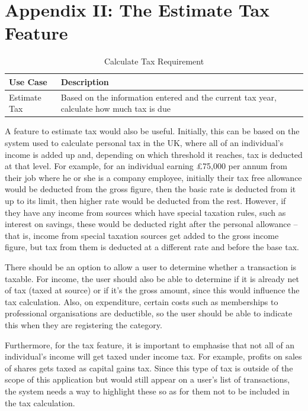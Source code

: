 \section{Appendix II: The Estimate Tax Feature} \label{appendix2}


\begin{table}[ht!]
  \centering
  \begin{tabular}{|p{4cm}|p{12cm}|}
    \hline
    \textbf{Use Case}&\textbf{Description}\\
    \hline
    Estimate Tax&Based on the information entered and the current tax year,
                 calculate how much tax is due\\
    \hline
  \end{tabular}
  \caption{Calculate Tax Requirement}
\end{table}
\FloatBarrier

A feature to estimate tax would also be useful. Initially, this can be based on
the system used to calculate personal tax in the UK, where all of an
individual's income is added up and, depending on which threshold it reaches,
tax is deducted at that level. For example, for an individual earning
\pounds75,000 per annum from their job where he or she is a company employee,
initially their tax free allowance would be deducted from the gross figure,
then the basic rate is deducted from it up to its limit, then higher rate would
be deducted from the rest. However, if they have any income from sources which
have special taxation rules, such as interest on savings, these would be
deducted right after the personal allowance -- that is, income from special
taxation sources get added to the gross income figure, but tax from them is
deducted at a different rate and before the base tax.

There should be an option to allow a user to determine whether a transaction is
taxable. For income, the user should also be able to determine if it is already
net of tax (taxed at source) or if it's the gross amount, since this would
influence the tax calculation. Also, on expenditure, certain costs such as
memberships to professional organisations are deductible, so the user should be
able to indicate this when they are registering the category.

Furthermore, for the tax feature, it is important to emphasise that not all of
an individual's income will get taxed under income tax. For example, profits on
sales of shares gets taxed as capital gains tax. Since this type of tax is
outside of the scope of this application but would still appear on a user's
list of transactions, the system needs a way to highlight these so as for them
not to be included in the tax calculation.



